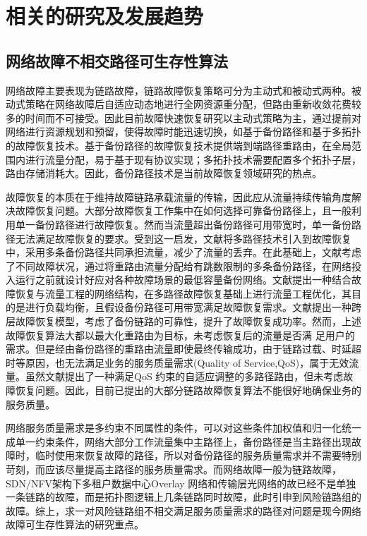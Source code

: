 \section{相关的研究及发展趋势}
\subsection{网络故障不相交路径可生存性算法}
网络故障主要表现为链路故障，链路故障恢复策略可分为主动式和被动式两种\cite{kvalbein2006fast,qi2012research}。被动式策略在网络故障后自适应动态地进行全网资源重分配，但路由重新收敛花费较多的时间而不可接受。因此目前故障快速恢复研究以主动式策略为主，通过提前对网络进行资源规划和预留，使得故障时能迅速切换，如基于备份路径和基于多拓扑\cite{shand2010ip}的故障恢复技术。基于备份路径的故障恢复技术提供端到端路径重路由，在全局范围内进行流量分配，易于基于现有协议实现；多拓扑技术需要配置多个拓扑子层，路由存储消耗大。因此，备份路径技术是当前故障恢复领域研究的热点\cite{yang2014keep,wang2010r3,banner2010designing,suchara2011network,zheng2014cross}。

故障恢复的本质在于维持故障链路承载流量的传输，因此应从流量持续传输角度解决故障恢复问题。大部分故障恢复工作集中在如何选择可靠备份路径上，且一般利用单一备份路径进行故障恢复。然而当流量超出备份路径可用带宽时，单一备份路径无法满足故障恢复的要求。受到这一启发，文献\cite{wang2010r3}将多路径技术引入到故障恢复中，采用多条备份路径共同承担流量，减少了流量的丢弃。在此基础上，文献\cite{banner2010designing}考虑了不同故障状况，通过将重路由流量分配给有跳数限制的多条备份路径，在网络投入运行之前就设计好应对各种故障场景的最低容量备份网络。文献\cite{suchara2011network}提出一种结合故障恢复与流量工程的网络结构，在多路径故障恢复基础上进行流量工程优化，其目的是进行负载均衡，且假设备份路径可用带宽满足故障恢复需求。文献\cite{zheng2014cross}提出一种跨层故障恢复模型，考虑了备份链路的可靠性，提升了故障恢复成功率。然而，上述故障恢复算法大都以最大化重路由为目标，未考虑恢复后的流量是否满
足用户的需求。但是经由备份路径的重路由流量即使最终传输成功，由于链路过载、时延超时等原因，也无法满足业务的服务质量需求(Quality of Service,QoS)，属于无效流量。虽然文献\cite{misra2009polynomial}提出了一种满足QoS 约束的自适应调整的多路径路由，但未考虑故障恢复问题。因此，目前已提出的大部分链路故障恢复算法不能很好地确保业务的服务质量。

网络服务质量需求是多约束不同属性的条件，可以对这些条件加权值和归一化统一成单一约束条件，网络大部分工作流量集中主路径上，备份路径是当主路径出现故障时，临时使用来恢复故障的路径，所以对备份路径的服务质量需求并不需要特别苛刻，而应该尽量提高主路径的服务质量需求。而网络故障一般为链路故障，SDN/NFV架构下多租户数据中心Overlay 网络和传输层光网络的故已经不是单独一条链路的故障，而是拓扑图逻辑上几条链路同时故障，此时引申到风险链路组的故障。综上，求一对风险链路组不相交满足服务质量需求的路径对问题是现今网络故障可生存性算法的研究重点。



